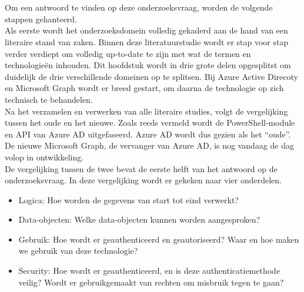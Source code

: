 
\chapter{}%
\label{ch:methodologie}


Om een antwoord te vinden op deze onderzoeksvraag, worden de volgende stappen gehanteerd. \\

Als eerste wordt het onderzoeksdomein volledig gekaderd aan de hand van een literaire stand van zaken. Binnen deze literatuurstudie wordt er stap voor stap verder verdiept om volledig up-to-date te zijn met wat de termen en technologieën inhouden. Dit hoofdstuk wordt in drie grote delen opgesplitst om duidelijk de drie verschillende domeinen op te splitsen. Bij Azure Active Direcoty en Microsoft Graph wordt er breed gestart, om daarna de technologie op zich technisch te behandelen. \\

Na het verzamelen en verwerken van alle literaire studies, volgt de vergelijking tussen het oude en het nieuwe. Zoals reeds vermeld wordt de PowerShell-module en \ac{API} van Azure \ac{AD} uitgefaseerd. Azure \ac{AD} wordt dus gezien als het “oude”. De nieuwe Microsoft Graph, de vervanger van Azure \ac{AD}, is nog vandaag de dag volop in ontwikkeling. \\

De vergelijking tussen de twee bevat de eerste helft van het antwoord op de onderzoeksvraag. In deze vergelijking wordt er gekeken naar vier onderdelen. \\

\begin{itemize}
    \item Logica: Hoe worden de gegevens van start tot eind verwerkt?
    \item Data-objecten: Welke data-objecten kunnen worden aangesproken?
    \item Gebruik: Hoe wordt er geauthenticeerd en geautoriseerd? Waar en hoe maken we gebruik van deze technologie?
    \item Security: Hoe wordt er geauthenticeerd, en is deze authenticatiemethode veilig? Wordt er gebruikgemaakt van rechten om misbruik tegen te gaan?
\end{itemize}


